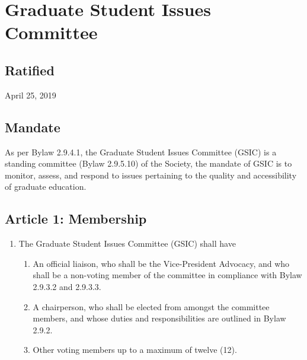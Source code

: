\section{Graduate Student Issues Committee}

\subsection{Ratified}
April 25, 2019

\subsection{Mandate}
As per Bylaw 2.9.4.1, the Graduate Student Issues Committee (GSIC) is a standing committee (Bylaw 2.9.5.10) of the Society, the mandate of GSIC is to monitor, assess, and respond to issues pertaining to the quality and accessibility of graduate education.

\subsection{Article 1: Membership}
\begin{enumerate}[label*=\arabic*., align=left]	
\item The Graduate Student Issues Committee (GSIC) shall have
\begin{enumerate}[label*=\arabic*., align=left]	
\item An official liaison, who shall be the Vice-President Advocacy, and who shall be a non-voting member of the committee in compliance with Bylaw 2.9.3.2 and 2.9.3.3.
\item A chairperson, who shall be elected from amongst the committee members, and whose duties and responsibilities are outlined in Bylaw 2.9.2.
\item Other voting members up to a maximum of twelve (12).
\end{enumerate}
\end{enumerate}

